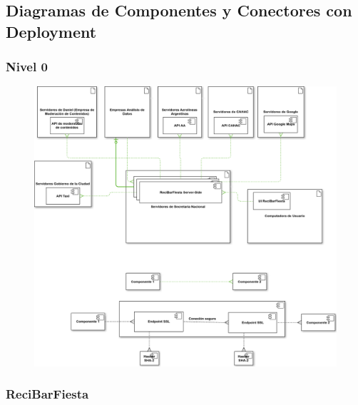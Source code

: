 \subsection{Diagramas de Componentes y Conectores con Deployment}

\subsubsection{Nivel 0}

\begin{figure}[H]
  \centering
  \includegraphics[width=\textwidth]{diagramas/Nivel0.png}
  \caption{\normalfont }
\end{figure} 


\subsubsection{ReciBarFiesta}

